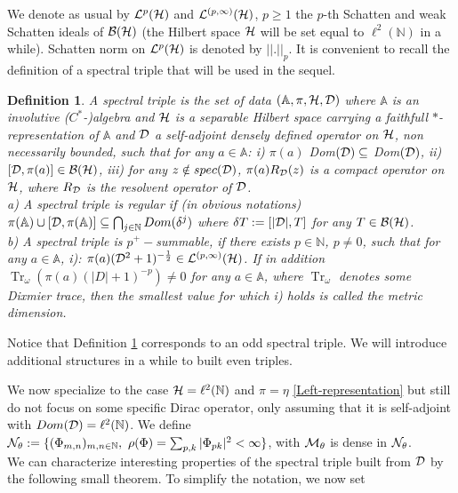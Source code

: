\documentclass[a4paper,11pt,twoside]{article}
\numberwithin{equation}{section}
\DeclareMathOperator{\tr}{Tr}
\newtheorem{definition}[Theorem]{Definition}
\theoremstyle{nonumberplain}
\newcounter{and}
\begin{document}
We denote as usual by ${\cal{L}}^p({\cal{H}})$ and ${\cal{L}}^{(p,\infty)}({\cal{H}})$, $p\ge1$ the $p$-th Schatten and weak Schatten ideals of ${\cal{B}}({\cal{H}})$ (the Hilbert space ${\cal{H}}$ will be set equal to $\ell^2(\mathbb{N})$ in a while). Schatten norm on ${\cal{L}}^p({\cal{H}})$ is denoted by $||.||_p$. It is convenient to recall the definition of a spectral triple that will be used in the sequel.
\begin{definition}\label{spect-triple}
A spectral triple is the set of data $(\mathbb{A},\pi,{\cal{H}},{\cal{D}})$ where $\mathbb{A}$ is an involutive ($C^*$-)algebra and ${\cal{H}}$ is a separable Hilbert space carrying a faithfull $*$-representation of $\mathbb{A}$ and  ${\cal{D}}$ a self-adjoint densely defined operator on ${\cal{H}}$, non necessarily bounded, such that for any $a\in\mathbb{A}$: i) $\pi(a)$ Dom$({\cal{D}})\subseteq$ Dom$({\cal{D}})$, ii) $[{\cal{D}},\pi(a)]\in{\cal{B}}({\cal{H}})$, iii) for any $z\notin spec({\cal{D}})$, $\pi(a)R_{{\cal{D}}}(z)$ is a compact operator on ${\cal{H}}$, where $R_{{\cal{D}}}$ is the resolvent operator of ${\cal{D}}$. \\
a) A spectral triple is regular if (in obvious notations) $\pi(\mathbb{A})\cup[{\cal{D}},\pi(\mathbb{A})]\subseteq\bigcap_{j\in\mathbb{N}}Dom(\delta^j)$ where $\delta T:=[|{\cal{D}}|,T]$ for any $T\in{\cal{B}}({\cal{H}})$.\\
b) A spectral triple is $p^+-$summable, if there exists $p\in\mathbb{N}$, $p\ne0$, such that for any $a\in\mathbb{A}$, i): $\pi(a)({\cal{D}}^2+1)^{-\frac{1}{2}}\in{\cal{L}}^{(p,\infty)}({\cal{H}})$. If in addition $\tr_\omega(\pi(a)(|D|+1)^{-p})\ne0$ for any $a\in\mathbb{A}$, where $\tr_\omega$ denotes some Dixmier trace, then the smallest value for which i) holds is called the metric dimension.
\end{definition}
Notice that Definition \ref{spect-triple} corresponds to an odd spectral triple. We will introduce additional structures in a while to built even triples.\par
We now specialize to the case ${\cal{H}}=\ell^2(\mathbb{N})$ and $\pi=\eta$ \eqref{Left-representation} but still do not focus on some specific Dirac operator, only assuming that it is self-adjoint with $Dom({\cal{D}})=\ell^2(\mathbb{N})$. We define ${ {\cal{N}}_\theta}:=\{(\Phi_{m,n})_{m,n\in\mathbb{N}},\ \rho(\Phi)=\sum_{p,k}|\Phi_{pk}|^2<\infty\}$, with ${\cal{M}}_\theta$ is dense in ${\cal{N}}_\theta$.\\
We can characterize interesting properties of the spectral triple built from ${\cal{D}}$ by the following small theorem. To simplify the notation, we now set 
\end{document}
